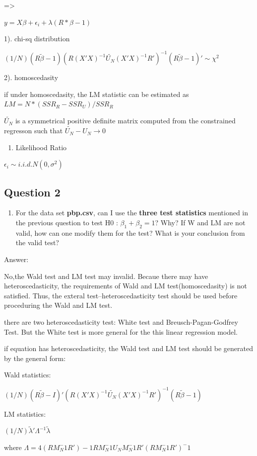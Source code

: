 \documentclass[]{article}
\providecommand{\tightlist}{%
  \setlength{\itemsep}{0pt}\setlength{\parskip}{0pt}}
\begin{document}
=\textgreater{} \centerline{$y=X\beta+\epsilon_{i}+\lambda(R*\beta-1)$}

1). chi-sq distribution

\centerline{$(1/N)(R\tilde{\beta}-1)(R(X'X)^{-1}\tilde{U_N}(X'X)^{-1}R')^{-1}(R\tilde{\beta}-1)'\sim{\chi}^2$}

2). homoscedasity

if under homoscedasity, the LM statistic can be estimated as
\(LM = N*(SSR_{R} - SSR_{U})/SSR_{R}\)

\(\tilde{U_N}\) is a symmetrical positive definite matrix computed from
the constrained regresson such that \(\tilde{U_N}-U_N\longrightarrow 0\)

\begin{enumerate}
\def\labelenumi{\arabic{enumi}.}
\setcounter{enumi}{2}
\tightlist
\item
  Likelihood Ratio
\end{enumerate}

\centerline{$\epsilon_i\sim i.i.d.N(0,\sigma^2)$}

\subsection{Question 2}\label{question-2}

\begin{enumerate}
\def\labelenumi{\arabic{enumi}.}
\setcounter{enumi}{1}
\tightlist
\item
  For the data set \textbf{pbp.csv}, can I use the \textbf{three test
  statistics} mentioned in the previous question to test H0 :
  \(\beta_{1} + \beta_{2} = 1\)? Why? If W and LM are not valid, how can
  one modify them for the test? What is your conclusion from the valid
  test?
\end{enumerate}

Answer:

No,the Wald test and LM test may invalid. Becaue there may have
heteroscedasticity, the requirements of Wald and LM test(homoscedasity)
is not satisfied. Thus, the exteral test--heteroscedasticity test should
be used before proceduring the Wald and LM test.

there are two heteroscedasticity test: White test and
Breusch-Pagan-Godfrey Test. But the White test is more general for the
this linear regression model.

if equation has heteroscedasticity, the Wald test and LM test should be
generated by the general form:

Wald statistics:
\centerline{$(1/N)(R\tilde{\beta}-I)'(R(X'X)^{-1}\tilde{U_N}(X'X)^{-1}R')^{-1}(R\tilde{\beta}-1)$}
LM statistics:
\centerline{$(1/N)\tilde\lambda'\Lambda^{-1}\tilde\lambda$} where
\(\Lambda=4(RM_N^-1R')-1RM_N^-1U_NM_N^-1R'(RM_N^-1R')^-1\)
\end{document}
